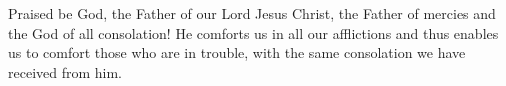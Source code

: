 Praised be God, the Father of our Lord Jesus Christ, the Father of mercies and the God of all consolation! He comforts us in all our afflictions and thus enables us to comfort those who are in trouble, with the same consolation we have received from him.